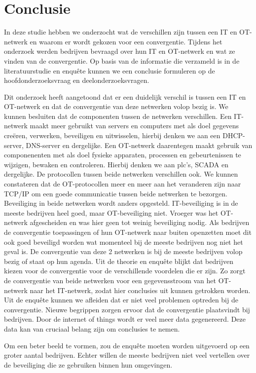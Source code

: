
\chapter{Conclusie}
\label{ch:conclusie}


In deze studie hebben we onderzocht wat de verschillen zijn tussen een IT en OT-netwerk en waarom er wordt gekozen voor een convergentie. Tijdens het onderzoek werden bedrijven bevraagd over hun IT en OT-netwerk en wat ze vinden van de convergentie. Op basis van de informatie die verzameld is in de literatuurstudie en enquête kunnen we een conclusie formuleren op de hoofdonderzoeksvraag en deelonderzoeksvragen.

Dit onderzoek heeft aangetoond dat er een duidelijk verschil is tussen een IT en OT-netwerk en dat de convergentie van deze netwerken volop bezig is. We kunnen besluiten dat de componenten tussen de netwerken verschillen. Een IT-netwerk maakt meer gebruikt van servers en computers met als doel gegevens creëren, verwerken, beveiligen en uitwisselen, hierbij denken we aan een DHCP-server, DNS-server en dergelijke. Een OT-netwerk daarentegen maakt gebruik van componenenten met als doel fysieke apparaten, processen en gebeurtenissen te wijzigen, bewaken en controleren. Hierbij denken we aan plc's, SCADA en dergelijke. De protocollen tussen beide netwerken verschillen ook. We kunnen constateren dat de OT-protocollen meer en meer aan het veranderen zijn naar TCP/IP om een goede communicatie tussen beide netwerken te bezorgen. Beveiliging in beide netwerken wordt anders opgesteld. IT-beveiliging is in de meeste bedrijven heel goed, maar OT-beveiliging niet. Vroeger was het OT-netwerk afgescheiden en was hier geen tot weinig beveiliging nodig. Als bedrijven de convergentie toepassingen of hun OT-netwerk naar buiten openzetten moet dit ook goed beveiligd worden wat momenteel bij de meeste bedrijven nog niet het geval is. De convergentie van deze 2 netwerken is bij de meeste bedrijven volop bezig of staat op hun agenda. Uit de theorie en enquête blijkt dat bedrijven kiezen voor de convergentie voor de verschillende voordelen die er zijn. Zo zorgt de convergentie van beide netwerken voor een gegevensstroom van het OT-netwerk naar het IT-netwerk, zodat hier conclusies uit kunnen getrokken worden. Uit de enquête kunnen we afleiden dat er niet veel problemen optreden bij de convergentie. Nieuwe begrippen zorgen ervoor dat de convergentie plaatsvindt bij bedrijven. Door de internet of things wordt er veel meer data gegenereerd. Deze data kan van cruciaal belang zijn om conclusies te nemen.

Om een beter beeld te vormen, zou de enquête moeten worden uitgevoerd op een groter aantal bedrijven. Echter willen de meeste bedrijven niet veel vertellen over de beveiliging die ze gebruiken binnen hun omgevingen.



